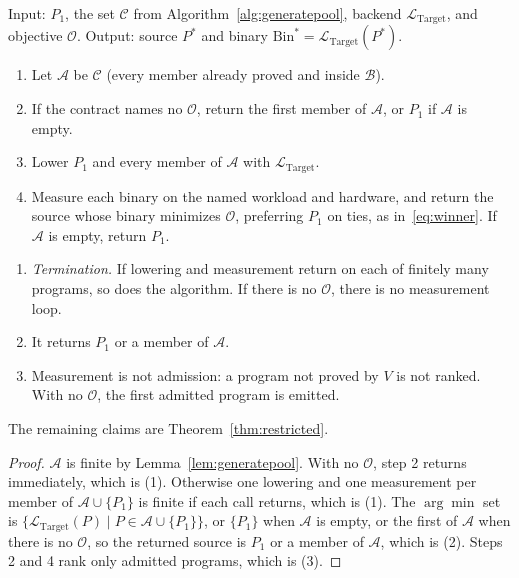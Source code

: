 \begin{algo}
\label{alg:winner}
Input: \(P_1\), the set \(\mathcal{C}\) from
Algorithm~\ref{alg:generatepool}, backend
\(\mathcal{L}_{\text{Target}}\), and objective \(\mathcal{O}\).
Output: source \(P^*\) and binary
\(\mathrm{Bin}^* = \mathcal{L}_{\text{Target}}(P^*)\).
\begin{enumerate}
  \item Let \(\mathcal{A}\) be \(\mathcal{C}\) (every member already
  proved and inside \(\mathcal{B}\)).
  \item If the contract names no \(\mathcal{O}\), return the first member
  of \(\mathcal{A}\), or \(P_1\) if \(\mathcal{A}\) is empty.
  \item Lower \(P_1\) and every member of \(\mathcal{A}\) with
  \(\mathcal{L}_{\text{Target}}\).
  \item Measure each binary on the named workload and hardware, and
  return the source whose binary minimizes \(\mathcal{O}\), preferring
  \(P_1\) on ties, as in~\eqref{eq:winner}. If \(\mathcal{A}\) is empty,
  return \(P_1\).
\end{enumerate}
\end{algo}

\begin{lemma}
\label{lem:winner}
\begin{enumerate}
  \item \emph{Termination.} If lowering and measurement return on each of
  finitely many programs, so does the algorithm. If there is no
  \(\mathcal{O}\), there is no measurement loop.
  \item It returns \(P_1\) or a member of \(\mathcal{A}\).
  \item Measurement is not admission: a program not proved by \(V\) is not
  ranked. With no \(\mathcal{O}\), the first admitted program is emitted.
\end{enumerate}
The remaining claims are Theorem~\ref{thm:restricted}.
\end{lemma}
\begin{proof}
\(\mathcal{A}\) is finite by Lemma~\ref{lem:generatepool}. With no
\(\mathcal{O}\), step 2 returns immediately, which is (1). Otherwise one
lowering and one measurement per member of
\(\mathcal{A} \cup \{P_1\}\) is finite if each call returns, which is (1).
The \(\arg\min\) set is
\(\{\mathcal{L}_{\text{Target}}(P) \mid P \in \mathcal{A} \cup \{P_1\}\}\),
or \(\{P_1\}\) when \(\mathcal{A}\) is empty, or the first of
\(\mathcal{A}\) when there is no \(\mathcal{O}\), so the returned source is
\(P_1\) or a member of \(\mathcal{A}\), which is (2). Steps 2 and 4 rank
only admitted programs, which is (3).
\end{proof}

